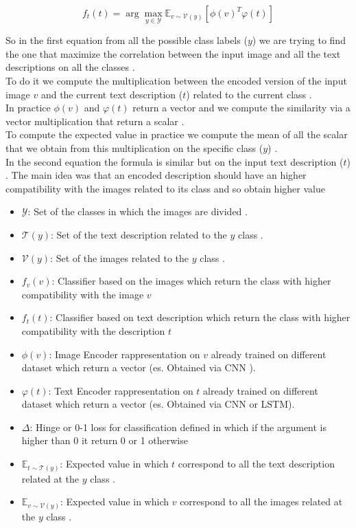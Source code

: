 \begin{equation}
    f_t(t) = \arg \max_{y \in \mathcal{Y}} \mathbb{E}_{v \sim \mathcal{V}(y)} [\phi(v)^T \varphi(t)]
\end{equation}

So in the first equation from all the possible class labels ($y$) we are trying to find the one that maximize the correlation between 
the input image and all the text descriptions on all the classes . \\
To do it we compute the multiplication between the encoded version of the input image $v$ and the current text description ($t$)
related to the current class . \\
In practice $\phi(v)$ and $\varphi(t )$ return a vector and we compute the similarity via a vector multiplication that return a scalar .\\ 
To compute the expected value in practice we compute the mean of all the scalar that we obtain from 
this multiplication on the specific class ($y$) .\\
In the second equation the formula is similar but on the input text description ($t$) .
The main idea was that an encoded description should have an higher compatibility 
with the images related to its class and so obtain higher value 

\begin{itemize}
    \item $\mathcal{Y}$: Set of the classes in which the images are divided .
    \item $\mathcal{T}(y)$: Set of the text description related to the $y$ class .
    \item $\mathcal{V}(y)$: Set of the images related to the $y$ class .
    \item $f_v(v)$: Classifier based on the images which return the class with higher compatibility with the image $v$
    \item $f_t(t)$: Classifier based on text description which return the class with higher compatibility with the description $t$
    \item $\phi(v)$: Image Encoder rappresentation on $v$ already trained on different dataset which return a vector (es. Obtained via CNN ).
    \item $\varphi(t)$: Text Encoder rappresentation on $t$ already trained on different dataset which return a vector (es. Obtained via CNN or LSTM).
    \item $\Delta$: Hinge or 0-1 loss for classification defined in which if the argument is higher than 0 it return 0 or 1 otherwise
    \item $\mathbb{E}_{t \sim \mathcal{T}(y)}$: Expected value in which $t$ correspond to all the text description related at the $y$ class .
    \item $\mathbb{E}_{v \sim \mathcal{V}(y)}$:  Expected value in which $v$ correspond to all the images related at the $y$ class .
\end{itemize}

